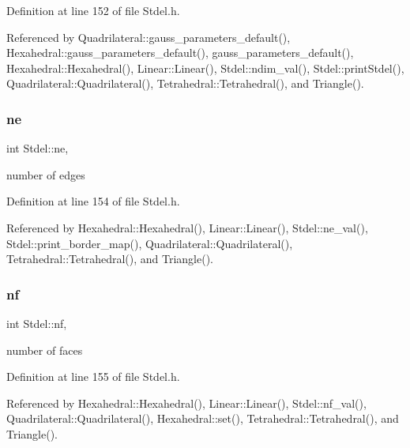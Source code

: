 Definition at line 152 of file Stdel.\+h.



Referenced by Quadrilateral\+::gauss\+\_\+parameters\+\_\+default(), Hexahedral\+::gauss\+\_\+parameters\+\_\+default(), gauss\+\_\+parameters\+\_\+default(), Hexahedral\+::\+Hexahedral(), Linear\+::\+Linear(), Stdel\+::ndim\+\_\+val(), Stdel\+::print\+Stdel(), Quadrilateral\+::\+Quadrilateral(), Tetrahedral\+::\+Tetrahedral(), and Triangle().

\mbox{\label{classStdel_aef3d1b34184b9fd03c0b655640c243b6}} 
\subsubsection{\texorpdfstring{ne}{ne}}
{\footnotesize\ttfamily int Stdel\+::ne\hspace{0.3cm}{\ttfamily [protected]}, {\ttfamily [inherited]}}



number of edges 



Definition at line 154 of file Stdel.\+h.



Referenced by Hexahedral\+::\+Hexahedral(), Linear\+::\+Linear(), Stdel\+::ne\+\_\+val(), Stdel\+::print\+\_\+border\+\_\+map(), Quadrilateral\+::\+Quadrilateral(), Tetrahedral\+::\+Tetrahedral(), and Triangle().

\mbox{\label{classStdel_a61987080026986a40412a8937aad4b24}} 
\subsubsection{\texorpdfstring{nf}{nf}}
{\footnotesize\ttfamily int Stdel\+::nf\hspace{0.3cm}{\ttfamily [protected]}, {\ttfamily [inherited]}}



number of faces 



Definition at line 155 of file Stdel.\+h.



Referenced by Hexahedral\+::\+Hexahedral(), Linear\+::\+Linear(), Stdel\+::nf\+\_\+val(), Quadrilateral\+::\+Quadrilateral(), Hexahedral\+::set(), Tetrahedral\+::\+Tetrahedral(), and Triangle().

